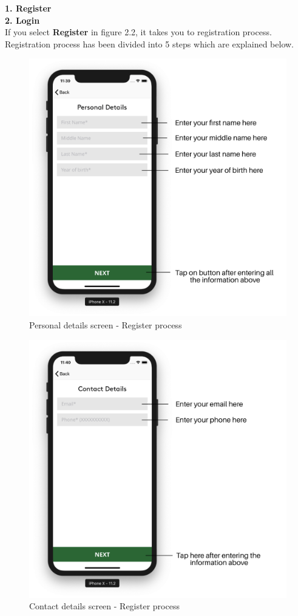 \begin{itemize}
    \textbf{1. Register} \\
    \textbf{2. Login} \\
    
    If you select \textbf{Register} in figure 2.2, it takes you to registration process. Registration process has been divided into 5 steps which are explained below.
    
    
        \begin{figure}[H]
            \centering
            \includegraphics[width=0.50\linewidth]{figures/ch2/register_personal.png}
            \caption{\label{fig:register_personal} Personal details screen - Register process}
        \end{figure}
  
        
        \begin{figure}[H]
            \centering
            \includegraphics[width=0.50\linewidth]{figures/ch2/register_contact.png}
            \caption{\label{fig:register_contact} Contact details screen - Register process}
        \end{figure}
     

\end{itemize}
